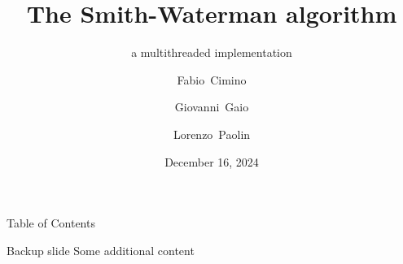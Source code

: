 \documentclass{beamer}
\title{The Smith-Waterman algorithm}
\subtitle{a multithreaded implementation}
\author[Cimino, Gaio, Paolin]{Fabio~Cimino \and Giovanni~Gaio \and Lorenzo~Paolin}
\date{December 16, 2024}
\begin{document}
\frame{\titlepage}

\begin{frame}{Table of Contents}
    \tableofcontents    
\end{frame}










    \appendix

    \begin{frame}{Backup slide}
        Some additional content
    \end{frame}
    
\end{document}

